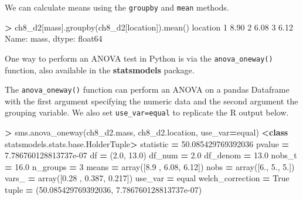 \documentclass[
]{book}
\newenvironment{Shaded}{\begin{snugshade}}{\end{snugshade}}
\newcommand{\BuiltInTok}[1]{#1}
\newcommand{\DecValTok}[1]{\textcolor[rgb]{0.00,0.00,0.81}{#1}}
\newcommand{\FloatTok}[1]{\textcolor[rgb]{0.00,0.00,0.81}{#1}}
\newcommand{\KeywordTok}[1]{\textcolor[rgb]{0.13,0.29,0.53}{\textbf{#1}}}
\newcommand{\NormalTok}[1]{#1}
\newcommand{\OperatorTok}[1]{\textcolor[rgb]{0.81,0.36,0.00}{\textbf{#1}}}
\newcommand{\StringTok}[1]{\textcolor[rgb]{0.31,0.60,0.02}{#1}}
\newcommand{\VariableTok}[1]{\textcolor[rgb]{0.00,0.00,0.00}{#1}}
\begin{document}
We can calculate means using the \texttt{groupby} and \texttt{mean} methods.

\begin{Shaded}
\begin{Highlighting}[]
\OperatorTok{\textgreater{}}\NormalTok{ ch8\_d2[}\StringTok{\textquotesingle{}mass\textquotesingle{}}\NormalTok{].groupby(ch8\_d2[}\StringTok{\textquotesingle{}location\textquotesingle{}}\NormalTok{]).mean()}
\NormalTok{location}
\DecValTok{1}    \FloatTok{8.90}
\DecValTok{2}    \FloatTok{6.08}
\DecValTok{3}    \FloatTok{6.12}
\NormalTok{Name: mass, dtype: float64}
\end{Highlighting}
\end{Shaded}

One way to perform an ANOVA test in Python is via the \texttt{anova\_oneway()} function, also available in the \textbf{statsmodels} package.

The \texttt{anova\_oneway()} function can perform an ANOVA on a pandas Dataframe with the first argument specifying the numeric data and the second argument the grouping variable. We also set \texttt{use\_var=\textquotesingle{}equal\textquotesingle{}} to replicate the R output below.

\begin{Shaded}
\begin{Highlighting}[]
\OperatorTok{\textgreater{}}\NormalTok{ sms.anova\_oneway(ch8\_d2.mass, ch8\_d2.location, use\_var}\OperatorTok{=}\StringTok{\textquotesingle{}equal\textquotesingle{}}\NormalTok{)}
\OperatorTok{\textless{}}\KeywordTok{class} \StringTok{\textquotesingle{}statsmodels.stats.base.HolderTuple\textquotesingle{}}\OperatorTok{\textgreater{}}
\NormalTok{statistic }\OperatorTok{=} \FloatTok{50.085429769392036}
\NormalTok{pvalue }\OperatorTok{=} \FloatTok{7.786760128813737e{-}07}
\NormalTok{df }\OperatorTok{=}\NormalTok{ (}\FloatTok{2.0}\NormalTok{, }\FloatTok{13.0}\NormalTok{)}
\NormalTok{df\_num }\OperatorTok{=} \FloatTok{2.0}
\NormalTok{df\_denom }\OperatorTok{=} \FloatTok{13.0}
\NormalTok{nobs\_t }\OperatorTok{=} \FloatTok{16.0}
\NormalTok{n\_groups }\OperatorTok{=} \DecValTok{3}
\NormalTok{means }\OperatorTok{=}\NormalTok{ array([}\FloatTok{8.9}\NormalTok{ , }\FloatTok{6.08}\NormalTok{, }\FloatTok{6.12}\NormalTok{])}
\NormalTok{nobs }\OperatorTok{=}\NormalTok{ array([}\FloatTok{6.}\NormalTok{, }\FloatTok{5.}\NormalTok{, }\FloatTok{5.}\NormalTok{])}
\NormalTok{vars\_ }\OperatorTok{=}\NormalTok{ array([}\FloatTok{0.28}\NormalTok{ , }\FloatTok{0.387}\NormalTok{, }\FloatTok{0.217}\NormalTok{])}
\NormalTok{use\_var }\OperatorTok{=} \StringTok{\textquotesingle{}equal\textquotesingle{}}
\NormalTok{welch\_correction }\OperatorTok{=} \VariableTok{True}
\BuiltInTok{tuple} \OperatorTok{=}\NormalTok{ (}\FloatTok{50.085429769392036}\NormalTok{, }\FloatTok{7.786760128813737e{-}07}\NormalTok{)}
\end{Highlighting}
\end{Shaded}
\end{document}
